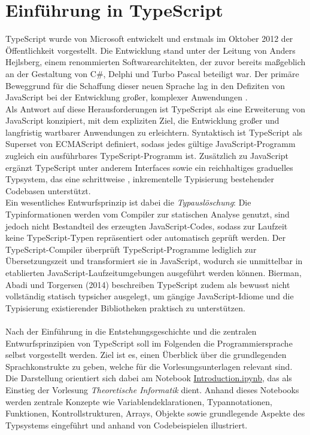 \section{Einführung in TypeScript}
TypeScript wurde von Microsoft entwickelt und erstmals im Oktober 2012 der Öffentlichkeit vorgestellt. Die Entwicklung stand unter der Leitung von Anders Hejlsberg, einem renommierten Softwarearchitekten, der zuvor bereits maßgeblich an der Gestaltung von C\#, Delphi und Turbo Pascal beteiligt war. \cite{typescript-wiki} \cite{typescript-github}
Der primäre Beweggrund für die Schaffung dieser neuen Sprache lag in den Defiziten von JavaScript bei der Entwicklung großer, komplexer Anwendungen \cite{typescript-wiki}.\\
Als Antwort auf diese Herausforderungen ist TypeScript als eine Erweiterung von JavaScript konzipiert, mit dem expliziten Ziel, die Entwicklung großer und langfristig wartbarer Anwendungen zu erleichtern. Syntaktisch ist TypeScript als Superset von ECMAScript definiert, sodass jedes gültige JavaScript-Programm zugleich ein ausführbares TypeScript-Programm ist. Zusätzlich zu JavaScript ergänzt TypeScript unter anderem Interfaces sowie ein reichhaltiges graduelles Typsystem, das eine schrittweise , inkrementelle Typisierung bestehender Codebasen unterstützt. \cite{understanding-typescript}\\
Ein wesentliches Entwurfsprinzip ist dabei die \emph{Typauslöschung}: Die Typinformationen werden vom Compiler zur statischen Analyse genutzt, sind jedoch nicht Bestandteil des erzeugten JavaScript-Codes, sodass zur Laufzeit keine TypeScript-Typen repräsentiert oder automatisch geprüft werden. Der TypeScript-Compiler überprüft TypeScript-Programme lediglich zur Übersetzungszeit und transformiert sie in JavaScript, wodurch sie unmittelbar in etablierten JavaScript-Laufzeitumgebungen ausgeführt werden können. Bierman, Abadi und Torgersen (2014) beschreiben TypeScript zudem als bewusst nicht vollständig statisch typsicher ausgelegt, um gängige JavaScript-Idiome und die Typisierung existierender Bibliotheken praktisch zu unterstützen. \cite{understanding-typescript} \\ \\
Nach der Einführung in die Entstehungsgeschichte und die zentralen Entwurfsprinzipien von TypeScript soll im Folgenden die Programmiersprache selbst vorgestellt werden. Ziel ist es, einen Überblick über die grundlegenden Sprachkonstrukte zu geben, welche für die Vorlesungsunterlagen relevant sind.\\
Die Darstellung orientiert sich dabei am Notebook \href{https://github.com/zLeoll/TS-Translation-for-TheoInf/blob/main/Algorithms/TypeScript/Chapter-02/Introduction.ipynb}{Introduction.ipynb}, das als Einstieg der Vorlesung \emph{Theoretische Informatik} dient. Anhand dieses Notebooks werden zentrale Konzepte wie Variablendeklarationen, Typannotationen, Funktionen, Kontrollstrukturen, Arrays, Objekte sowie grundlegende Aspekte des Typsystems eingeführt und anhand von Codebeispielen illustriert.

